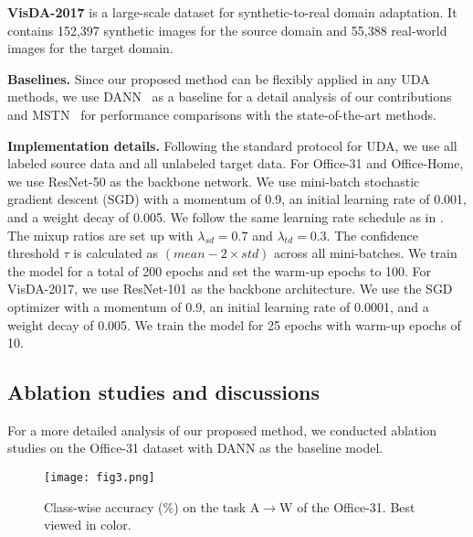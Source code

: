 \documentclass[final]{cvpr}
\begin{document}
\textbf{VisDA-2017} \cite{VisDA2017} is a large-scale dataset for synthetic-to-real domain adaptation. It contains 152,397 synthetic images for the source domain and 55,388 real-world images for the target domain.

\textbf{Baselines.} Since our proposed method can be flexibly applied in any UDA methods, we use DANN~\cite{Ganin2015} as a baseline for a detail analysis of our contributions and MSTN~\cite{MSTN} for performance comparisons with the state-of-the-art methods.

\textbf{Implementation details.} Following the standard protocol for UDA, we use all labeled source data and all unlabeled target data. For Office-31 and Office-Home, we use ResNet-50 \cite{ResNet1, ResNet2} as the backbone network. We use mini-batch stochastic gradient descent (SGD) with a momentum of 0.9, an initial learning rate of 0.001, and a weight decay of 0.005. We follow the same learning rate schedule as in \cite{Ganin2015}. The mixup ratios are set up with $\lambda_{sd}= 0.7$ and $\lambda_{td}= 0.3$. The confidence threshold $\tau$ is calculated as $({mean} - 2\times{std})$ across all mini-batches. We train the model for a total of 200 epochs and set the warm-up epochs to 100. For VisDA-2017, we use ResNet-101 as the backbone architecture. We use the SGD optimizer with a momentum of 0.9, an initial learning rate of 0.0001, and a weight decay of 0.005. We train the model for 25 epochs with warm-up epochs of 10. 


\subsection{Ablation studies and discussions}
For a more detailed analysis of our proposed method, we conducted ablation studies on the Office-31 dataset with DANN \cite{Ganin2015} as the baseline model. 

\begin{figure}[t]
\centering
\texttt{[image: fig3.png]}
\caption{Class-wise accuracy (\%) on the task A$\rightarrow$W of the Office-31. Best viewed in color.}
\label{fig:03}
\end{figure}
\end{document}
